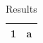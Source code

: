 \documentclass{article}
\begin{document}
\begin{longtable}{|l|l|}
\caption{Results}\\\hline
1 & a\\\hline
\end{longtable}
\end{document}
